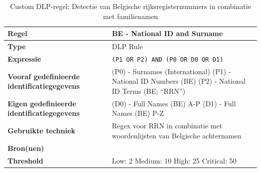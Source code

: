 \begin{table}[H]
    \centering
    \small
    \scriptsize
    \begin{tabular}{p{4cm} p{10cm}}
        \toprule
        \textbf{Regel} & BE \-- National ID and Surname \\
        \midrule
        \textbf{Type} & DLP Rule \\
        \textbf{Expressie} & \texttt{(P1 OR P2) AND (P0 OR D0 OR D1)} \\
        \textbf{Vooraf gedefinieerde identificatiegegevens} & 
        (P0) \-- Surnames (International) \newline
        (P1) \-- National ID Numbers (BE) \newline
        (P2) \-- National ID Terms (BE; “RRN”) \\
        \textbf{Eigen gedefinieerde identificatiegegevens} & 
        (D0) \-- Full Names (BE) A-P \newline
        (D1) \-- Full Names (BE) P-Z \\
        \textbf{Gebruikte techniek} & Regex voor RRN in combinatie met woordenlijsten van Belgische achternamen \\
        \textbf{Bron(nen)} & \textcite{Statbel2023, Statbel2024} \\
        \textbf{Threshold} & Low: 2 \quad Medium: 10 \quad High: 25 \quad Critical: 50 \\
        \bottomrule
    \end{tabular}
    \caption{Custom DLP-regel: Detectie van Belgische rijksregisternummers in combinatie met familienamen}
    \label{tab:custom-be-id}
\end{table}



